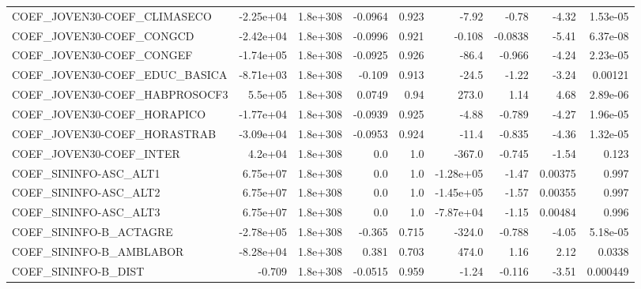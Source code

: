 \begin{tabular}{lrrrrrrrr}
COEF\_JOVEN30-COEF\_CLIMASECO       &   -2.25e+04 &     1.8e+308 & -0.0964 &    0.923 &      -7.92 &       -0.78 &        -4.32 &      1.53e-05 \\
COEF\_JOVEN30-COEF\_CONGCD          &   -2.42e+04 &     1.8e+308 & -0.0996 &    0.921 &     -0.108 &     -0.0838 &        -5.41 &      6.37e-08 \\
COEF\_JOVEN30-COEF\_CONGEF          &   -1.74e+05 &     1.8e+308 & -0.0925 &    0.926 &      -86.4 &      -0.966 &        -4.24 &      2.23e-05 \\
COEF\_JOVEN30-COEF\_EDUC\_BASICA     &   -8.71e+03 &     1.8e+308 &  -0.109 &    0.913 &      -24.5 &       -1.22 &        -3.24 &       0.00121 \\
COEF\_JOVEN30-COEF\_HABPROSOCF3     &     5.5e+05 &     1.8e+308 &  0.0749 &     0.94 &      273.0 &        1.14 &         4.68 &      2.89e-06 \\
COEF\_JOVEN30-COEF\_HORAPICO        &   -1.77e+04 &     1.8e+308 & -0.0939 &    0.925 &      -4.88 &      -0.789 &        -4.27 &      1.96e-05 \\
COEF\_JOVEN30-COEF\_HORASTRAB       &   -3.09e+04 &     1.8e+308 & -0.0953 &    0.924 &      -11.4 &      -0.835 &        -4.36 &      1.32e-05 \\
COEF\_JOVEN30-COEF\_INTER           &     4.2e+04 &     1.8e+308 &     0.0 &      1.0 &     -367.0 &      -0.745 &        -1.54 &         0.123 \\
COEF\_SININFO-ASC\_ALT1             &    6.75e+07 &     1.8e+308 &     0.0 &      1.0 &  -1.28e+05 &       -1.47 &      0.00375 &         0.997 \\
COEF\_SININFO-ASC\_ALT2             &    6.75e+07 &     1.8e+308 &     0.0 &      1.0 &  -1.45e+05 &       -1.57 &      0.00355 &         0.997 \\
COEF\_SININFO-ASC\_ALT3             &    6.75e+07 &     1.8e+308 &     0.0 &      1.0 &  -7.87e+04 &       -1.15 &      0.00484 &         0.996 \\
COEF\_SININFO-B\_ACTAGRE            &   -2.78e+05 &     1.8e+308 &  -0.365 &    0.715 &     -324.0 &      -0.788 &        -4.05 &      5.18e-05 \\
COEF\_SININFO-B\_AMBLABOR           &   -8.28e+04 &     1.8e+308 &   0.381 &    0.703 &      474.0 &        1.16 &         2.12 &        0.0338 \\
COEF\_SININFO-B\_DIST               &      -0.709 &     1.8e+308 & -0.0515 &    0.959 &      -1.24 &      -0.116 &        -3.51 &      0.000449 \\

\end{tabular}

